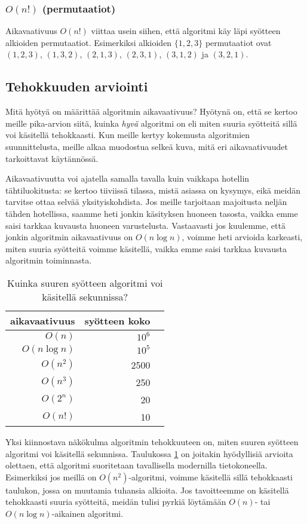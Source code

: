 \subsubsection{$O(n!)$ (permutaatiot)}

Aikavaativuus $O(n!)$ viittaa usein siihen,
että algoritmi käy läpi syötteen alkioiden permutaatiot.
Esimerkiksi alkioiden $\{1,2,3\}$ permutaatiot ovat
$(1,2,3)$, $(1,3,2)$, $(2,1,3)$, $(2,3,1)$, $(3,1,2)$ ja $(3,2,1)$.

\subsection{Tehokkuuden arviointi}

Mitä hyötyä on määrittää algoritmin aikavaativuus?
Hyötynä on, että se kertoo meille pika-arvion siitä,
kuinka \emph{hyvä} algoritmi on eli miten suuria syötteitä
sillä voi käsitellä tehokkaasti.
Kun meille kertyy kokemusta algoritmien suunnittelusta,
meille alkaa muodostua selkeä kuva,
mitä eri aikavaativuudet tarkoittavat käytännössä.

Aikavaativuutta voi ajatella samalla tavalla kuin vaikkapa
hotellin tähti\-luokitusta: se kertoo tiiviissä tilassa,
mistä asiassa on kysymys, eikä meidän tarvitse ottaa selvää yksityiskohdista.
Jos meille tarjoitaan majoitusta neljän tähden hotellissa,
saamme heti jonkin käsityksen huoneen tasosta,
vaikka emme saisi tarkkaa kuvausta huoneen varustelusta.
Vastaavasti jos kuulemme, että jonkin algoritmin aikavaativuus on $O(n \log n)$,
voimme heti arvioida karkeasti, miten suuria syötteitä voimme käsitellä,
vaikka emme saisi tarkkaa kuvausta algoritmin toiminnasta.

\begin{table}
\center
\begin{tabular}{rrr}
aikavaativuus & syötteen koko \\
\hline
$O(n)$ & $10^6$ & \\
$O(n \log n)$ & $10^5$ & \\
$O(n^2)$ & 2500 & \\
$O(n^3)$ & 250 & \\
$O(2^n)$ & 20 & \\
$O(n!)$ & 10 & \\
\end{tabular}
\caption{Kuinka suuren syötteen algoritmi voi käsitellä sekunnissa?}
\label{tab:algteh}
\end{table}

Yksi kiinnostava näkökulma algoritmin tehokkuuteen on,
miten suuren syötteen algoritmi voi käsitellä sekunnissa.
Taulukossa \ref{tab:algteh} on joitakin hyödyl\-lisiä arvioita
olettaen, että algoritmi suoritetaan tavallisella modernilla tietokoneella.
Esimerkiksi jos meillä on $O(n^2)$-algoritmi, voimme käsitellä sillä
tehokkaasti taulukon, jossa on muutamia tuhansia alkioita.
Jos tavoitteemme on käsitellä tehokkaasti suuria syötteitä,
meidän tulisi pyrkiä löytämään $O(n)$- tai $O(n \log n)$-aikainen
algoritmi.

